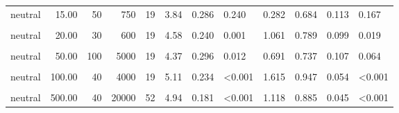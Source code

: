 \documentclass[
]{article}
\begin{document}
\begin{longtable}[t]{lrrrrrrlrrrl}
\hspace{1em}neutral & 15.00 & 50 & 750 & 19 & 3.84 & 0.286 & 0.240 & 0.282 & 0.684 & 0.113 & 0.167\\
\hspace{1em}\cellcolor{gray!10}{neutral} & \cellcolor{gray!10}{20.00} & \cellcolor{gray!10}{10} & \cellcolor{gray!10}{200} & \cellcolor{gray!10}{52} & \cellcolor{gray!10}{4.10} & \cellcolor{gray!10}{0.206} & \cellcolor{gray!10}{0.006} & \cellcolor{gray!10}{0.405} & \cellcolor{gray!10}{0.654} & \cellcolor{gray!10}{0.067} & \cellcolor{gray!10}{0.036}\\
\hspace{1em}neutral & 20.00 & 30 & 600 & 19 & 4.58 & 0.240 & 0.001 & 1.061 & 0.789 & 0.099 & 0.019\\
\hspace{1em}\cellcolor{gray!10}{neutral} & \cellcolor{gray!10}{50.00} & \cellcolor{gray!10}{10} & \cellcolor{gray!10}{500} & \cellcolor{gray!10}{52} & \cellcolor{gray!10}{4.62} & \cellcolor{gray!10}{0.182} & \cellcolor{gray!10}{<0.001} & \cellcolor{gray!10}{0.857} & \cellcolor{gray!10}{0.827} & \cellcolor{gray!10}{0.053} & \cellcolor{gray!10}{<0.001}\\
\hspace{1em}neutral & 50.00 & 100 & 5000 & 19 & 4.37 & 0.296 & 0.012 & 0.691 & 0.737 & 0.107 & 0.064\\
\hspace{1em}\cellcolor{gray!10}{neutral} & \cellcolor{gray!10}{100.00} & \cellcolor{gray!10}{30} & \cellcolor{gray!10}{3000} & \cellcolor{gray!10}{52} & \cellcolor{gray!10}{4.44} & \cellcolor{gray!10}{0.201} & \cellcolor{gray!10}{<0.001} & \cellcolor{gray!10}{0.657} & \cellcolor{gray!10}{0.827} & \cellcolor{gray!10}{0.053} & \cellcolor{gray!10}{<0.001}\\
\hspace{1em}neutral & 100.00 & 40 & 4000 & 19 & 5.11 & 0.234 & <0.001 & 1.615 & 0.947 & 0.054 & <0.001\\
\hspace{1em}\cellcolor{gray!10}{neutral} & \cellcolor{gray!10}{500.00} & \cellcolor{gray!10}{10} & \cellcolor{gray!10}{5000} & \cellcolor{gray!10}{19} & \cellcolor{gray!10}{4.84} & \cellcolor{gray!10}{0.345} & \cellcolor{gray!10}{0.002} & \cellcolor{gray!10}{0.917} & \cellcolor{gray!10}{0.789} & \cellcolor{gray!10}{0.099} & \cellcolor{gray!10}{0.019}\\
\hspace{1em}neutral & 500.00 & 40 & 20000 & 52 & 4.94 & 0.181 & <0.001 & 1.118 & 0.885 & 0.045 & <0.001\\

\end{longtable}
\end{document}
